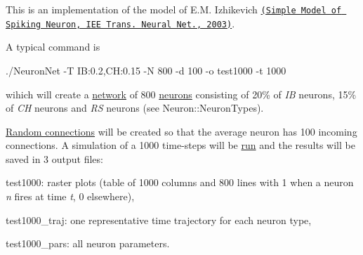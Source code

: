 This is an implementation of the model of E.\+M. Izhikevich \href{https://www.izhikevich.org/publications/spikes.pdf}{\tt (Simple Model of Spiking Neuron, I\+EE Trans. Neural Net., 2003)}.

A typical command is \begin{DoxyVerb}./NeuronNet -T IB:0.2,CH:0.15 -N 800 -d 100 -o test1000 -t 1000\end{DoxyVerb}
 wihich will create a \hyperlink{classNetwork}{network} of 800 \hyperlink{classNeuron}{neurons} consisting of 20\% of {\itshape IB} neurons, 15\% of {\itshape CH} neurons and {\itshape RS} neurons (see Neuron\+::\+Neuron\+Types).

\hyperlink{classNetwork_a4c751a78c7bc5e27c6b36df78c9c70c0}{Random connections} will be created so that the average neuron has 100 incoming connections. A simulation of a 1000 time-\/steps will be \hyperlink{classSimulation_ae5c367f87c0b5dc9740bc6d00e44e72c}{run} and the results will be saved in 3 output files\+:
\begin{DoxyItemize}
\item test1000\+: raster plots (table of 1000 columns and 800 lines with 1 when a neuron {\itshape n} fires at time {\itshape t}, 0 elsewhere),
\item test1000\+\_\+traj\+: one representative time trajectory for each neuron type,
\item test1000\+\_\+pars\+: all neuron parameters. 
\end{DoxyItemize}